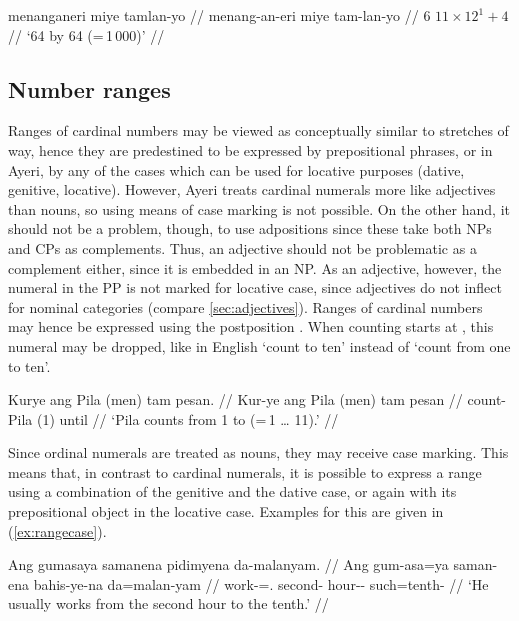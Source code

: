\a\begingl
	\gla menanganeri miye tamlan-yo //
	\glb menang-an-eri miye tam-lan-yo //
	 {$6$} {$11 \times 12^1 + 4$} //
	\glft `6\elv{}4 by 6\elv{}4 (=\,1\,000)' //
\endgl

\xe


\subsection{Number ranges}

Ranges of cardinal numbers may be viewed as conceptually similar to stretches
of way, hence they are predestined to be expressed by prepositional phrases, or
in Ayeri, by any of the cases which can be used for locative purposes (dative,
genitive, locative). However, Ayeri treats cardinal numerals more like
adjectives than nouns, so using means of case marking is not possible. On the
other hand, it should not be a problem, though, to use adpositions since these
take both NPs and CPs as complements. Thus, an adjective should not be
problematic as a complement either, since it is embedded in an NP. As an
adjective, however, the numeral in the PP is not marked for locative case,
since adjectives do not inflect for nominal categories (compare
\autoref{sec:adjectives}). Ranges of cardinal numbers may hence be expressed
using the postposition . When counting starts at
, this numeral may be dropped, like in English `count to
ten' instead of `count from one to ten'.

\ex
\begingl
	\gla Kurye ang Pila {\normalfont (}men{\normalfont )} tam pesan. //
	\glb Kur-ye ang Pila (men) tam pesan //
	\glc count-\TsgF{} \Aarg{} Pila (1) \elv{} until //
	\glft `Pila counts from 1 to \elv{} (=\,1 … 11).' //
\endgl
\xe

Since ordinal numerals are treated as nouns, they may receive case marking. 
This means that, in contrast to cardinal numerals, it is possible to express a 
range using a combination of the genitive and the dative case, or again 
 with its prepositional object in the locative case. 
Examples for this are given in (\ref{ex:rangecase}).

\pex\label{ex:rangecase}
\a\label{ex:rangecase1}\begingl
	\gla Ang gumasaya samanena pidimyena da-malanyam. //
	\glb Ang gum-asa=ya saman-ena bahis-ye-na da=malan-yam //
	\glc \AgtT{} work-\Hab{}=\TsgM{}.\Top{} second-\Gen{} hour-\Pl{}-\Gen{} 
		such=tenth-\Dat{} //
	\glft `He usually works from the second hour to the tenth.' //
\endgl

